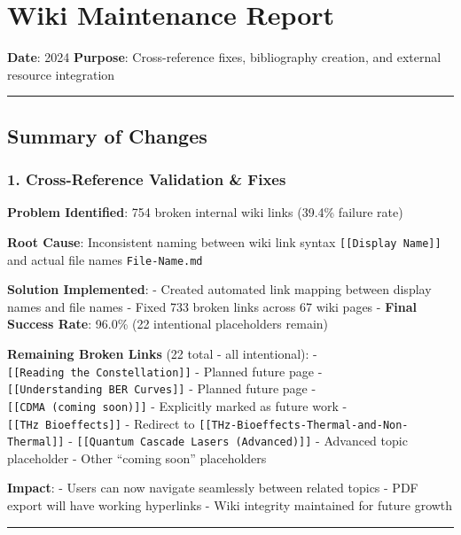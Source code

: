 \section{Wiki Maintenance Report}\label{wiki-maintenance-report}

\textbf{Date}: 2024 \textbf{Purpose}: Cross-reference fixes,
bibliography creation, and external resource integration

\begin{center}\rule{0.5\linewidth}{0.5pt}\end{center}

\subsection{Summary of Changes}\label{summary-of-changes}

\subsubsection{1. Cross-Reference Validation \&
Fixes}\label{cross-reference-validation-fixes}

\textbf{Problem Identified}: 754 broken internal wiki links (39.4\%
failure rate)

\textbf{Root Cause}: Inconsistent naming between wiki link syntax
\texttt{{[}{[}Display\ Name{]}{]}} and actual file names
\texttt{File-Name.md}

\textbf{Solution Implemented}: - Created automated link mapping between
display names and file names - Fixed 733 broken links across 67 wiki
pages - \textbf{Final Success Rate}: 96.0\% (22 intentional placeholders
remain)

\textbf{Remaining Broken Links} (22 total - all intentional): -
\texttt{{[}{[}Reading\ the\ Constellation{]}{]}} - Planned future page -
\texttt{{[}{[}Understanding\ BER\ Curves{]}{]}} - Planned future page -
\texttt{{[}{[}CDMA\ (coming\ soon){]}{]}} - Explicitly marked as future
work - \texttt{{[}{[}THz\ Bioeffects{]}{]}} - Redirect to
\texttt{{[}{[}THz-Bioeffects-Thermal-and-Non-Thermal{]}{]}} -
\texttt{{[}{[}Quantum\ Cascade\ Lasers\ (Advanced){]}{]}} - Advanced
topic placeholder - Other ``coming soon'' placeholders

\textbf{Impact}: - Users can now navigate seamlessly between related
topics - PDF export will have working hyperlinks - Wiki integrity
maintained for future growth

\begin{center}\rule{0.5\linewidth}{0.5pt}\end{center}

